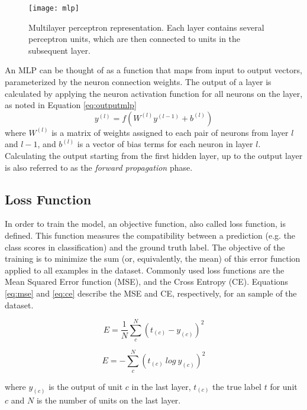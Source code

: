 \begin{figure}[!htb]
\centering
\texttt{[image: mlp]}
\caption{Multilayer perceptron representation. Each layer contains several perceptron units, which are then connected to units in the subsequent layer.}
\label{mlp}
\end{figure}

An MLP can be thought of as a function that maps from input to output vectors, parameterized by the neuron connection weights. The output of a layer
is calculated by applying the neuron activation function for all neurons on the layer, as
noted in Equation \ref{eq:outputmlp}
\begin{equation}
y^{(l)} = f(W^{(l)} y^{(l-1)} + b^{(l)})
\label{eq:outputmlp}
\end{equation}
where $W^{(l)}$ is a matrix of weights assigned to each pair of neurons from layer $l$ and $l-1$, and $b^{(l)}$ is a vector of bias terms for each neuron in layer $l$. Calculating the output starting from the first hidden layer, up to the output layer is also referred to as the \textit{forward propagation} phase.

\subsection{Loss Function}
In order to train the model, an objective function, also called loss function, is defined.
This function measures the compatibility between a prediction (e.g. the class scores in classification) and the ground truth label. The
objective of the training is to minimize the sum (or, equivalently, the mean) of
this error function applied to all examples in the dataset. Commonly used loss functions
are the Mean Squared Error function (MSE), and the Cross Entropy (CE). Equations \ref{eq:mse} and \ref{eq:ce} describe the MSE and CE, respectively, for an sample of the dataset.

\begin{equation}
E =  \frac{1}{N} \sum_{c}^{N} (t_{(c)} - y^{}_{(c)} )^2 
\label{eq:mse}
\end{equation}

\begin{equation}
E = - \sum_{c}^{N} (t_{(c)} \: log \: y^{}_{(c)} )^2 
\label{eq:ce}
\end{equation}

where $y^{}_{(c)}$ is the output of unit $c$ in the last layer, $t_{(c)}$
the true label $t$ for unit $c$ and $N$ is the number of units on the last layer.
